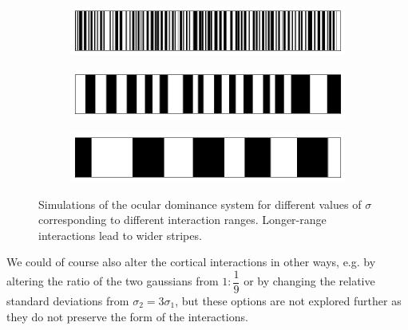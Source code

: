 \documentclass{article}
\begin{document}
\begin{figure}[h]
	\centering
	\begin{subfigure}[t]{0.60\linewidth}
		\centering
		\includegraphics[width = 1.0\linewidth, trim={0 0 0 0}, clip=true]{figures/occsim_012_heat.png}
	\end{subfigure}%
	\hspace{0.03\linewidth}
	\begin{subfigure}[t]{0.60\linewidth}
		\centering
		\includegraphics[width = 1.0\linewidth, trim={0 0 0 0}, clip=true]{figures/occsim_066_heat.png}
	\end{subfigure}%
	\hspace{0.03\linewidth}
	\begin{subfigure}[t]{0.60\linewidth}
		\centering
		\includegraphics[width = 1.0\linewidth, trim={0 0 0 0}, clip=true]{figures/occsim_174_heat.png}
	\end{subfigure}%
\caption{Simulations of the ocular dominance system for different values of $\sigma$ corresponding to different interaction ranges. Longer-range interactions lead to wider stripes.}
\label{fig:sigs}
\end{figure}

We could of course also alter the cortical interactions in other ways, e.g. by altering the ratio of the two gaussians from $1 : \dfrac{1}{9}$ or by changing the relative standard deviations from $\sigma_2 = 3 \sigma_1$, but these options are not explored further as they do not preserve the form of the interactions.
\end{document}
